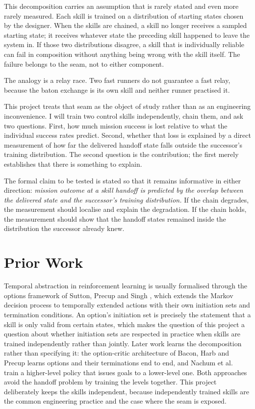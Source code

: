 \documentclass[11pt]{article}
\begin{document}
This decomposition carries an assumption that is rarely stated and even more rarely
measured. Each skill is trained on a distribution of starting states chosen by the
designer. When the skills are chained, a skill no longer receives a sampled starting
state; it receives whatever state the preceding skill happened to leave the system in.
If those two distributions disagree, a skill that is individually reliable can fail in
composition without anything being wrong with the skill itself. The failure belongs to
the seam, not to either component.

The analogy is a relay race. Two fast runners do not guarantee a fast relay, because
the baton exchange is its own skill and neither runner practised it.

This project treats that seam as the object of study rather than as an engineering
inconvenience. I will train two control skills independently, chain them, and ask two
questions. First, how much mission success is lost relative to what the individual
success rates predict. Second, whether that loss is explained by a direct measurement
of how far the delivered handoff state falls outside the successor's training
distribution. The second question is the contribution; the first merely establishes
that there is something to explain.

The formal claim to be tested is stated so that it remains informative in either
direction: \emph{mission outcome at a skill handoff is predicted by the overlap
between the delivered state and the successor's training distribution.} If the chain
degrades, the measurement should localise and explain the degradation. If the chain
holds, the measurement should show that the handoff states remained inside the
distribution the successor already knew.

\section{Prior Work}

Temporal abstraction in reinforcement learning is usually formalised through the
options framework of Sutton, Precup and Singh \cite{sutton1999}, which extends the
Markov decision process to temporally extended actions with their own initiation
sets and termination conditions. An option's initiation set is precisely the
statement that a skill is only valid from certain states, which makes the question
of this project a question about whether initiation sets are respected in practice
when skills are trained independently rather than jointly. Later work learns the
decomposition rather than specifying it: the option-critic architecture of Bacon,
Harb and Precup \cite{bacon2017} learns options and their terminations end to end,
and Nachum et al.~\cite{nachum2018} train a higher-level policy that issues goals to
a lower-level one. Both approaches avoid the handoff problem by training the levels
together. This project deliberately keeps the skills independent, because
independently trained skills are the common engineering practice and the case where
the seam is exposed.
\end{document}
